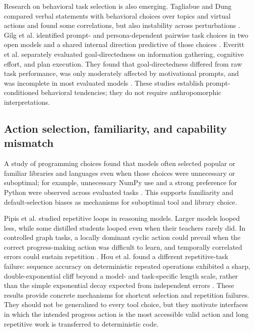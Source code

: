 \documentclass[11pt,a4paper]{article}
\begin{document}
Research on behavioral task selection is also emerging. Tagliabue and Dung compared verbal statements with behavioral choices over topics and virtual actions and found some correlations, but also instability across perturbations \cite{tagliabue2025}. Gilg et al. identified prompt- and persona-dependent pairwise task choices in two open models and a shared internal direction predictive of those choices \cite{gilg2026}. Everitt et al. separately evaluated goal-directedness on information gathering, cognitive effort, and plan execution. They found that goal-directedness differed from raw task performance, was only moderately affected by motivational prompts, and was incomplete in most evaluated models \cite{everitt2025goals}. These studies establish prompt-conditioned behavioral tendencies; they do not require anthropomorphic interpretations.

\subsection{Action selection, familiarity, and capability mismatch}\label{sec:lit-capability}

A study of programming choices found that models often selected popular or familiar libraries and languages even when those choices were unnecessary or suboptimal; for example, unnecessary NumPy use and a strong preference for Python were observed across evaluated tasks \cite{twist2026}. This supports familiarity and default-selection biases as mechanisms for suboptimal tool and library choice.

Pipis et al. studied repetitive loops in reasoning models. Larger models looped less, while some distilled students looped even when their teachers rarely did. In controlled graph tasks, a locally dominant cyclic action could prevail when the correct progress-making action was difficult to learn, and temporally correlated errors could sustain repetition \cite{pipis2025}. Hou et al. found a different repetitive-task failure: sequence accuracy on deterministic repeated operations exhibited a sharp, double-exponential cliff beyond a model- and task-specific length scale, rather than the simple exponential decay expected from independent errors \cite{hou2025focus}. These results provide concrete mechanisms for shortcut selection and repetition failures. They should not be generalized to every tool choice, but they motivate interfaces in which the intended progress action is the most accessible valid action and long repetitive work is transferred to deterministic code.
\end{document}
